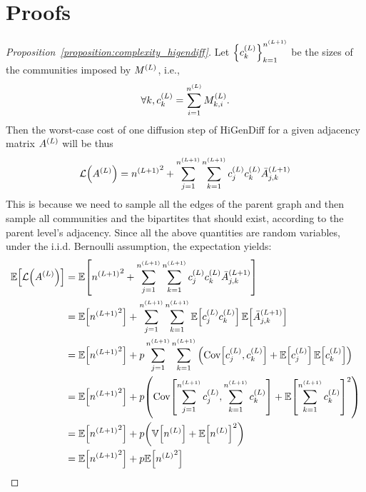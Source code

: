\section{Proofs}
\label{sec:appendix_higendiff_theory}
\begin{proof}[Proposition~\ref{proposition:complexity_higendiff}]
Let $\mathopen{}\left\{c^{\mathopen{}\left(L\right)}_k\right\}_{k=1}^{n^{\mathopen{}\left(L+1\right)}}$ be the sizes of the communities imposed by $M^{\mathopen{}\left(L\right)}$, i.e., 
\begin{equation}
    \forall k, c^{\mathopen{}\left(L\right)}_k=\sum_{i=1}^{n^{\mathopen{}\left(L\right)}}{M^{\mathopen{}\left(L\right)}_{k,i}}.
\end{equation}
Then the worst-case cost of one diffusion step of HiGenDiff for a given adjacency matrix $A^{\mathopen{}\left(L\right)}$ will be thus
\begin{equation}
    \mathcal{L}\mathopen{}\left(A^{\mathopen{}\left(L\right)}\right)={n^{\mathopen{}\left(L+1\right)}}^2 + \sum_{j=1}^{n^{\mathopen{}\left(L+1\right)}}\sum_{k=1}^{n^{\mathopen{}\left(L+1\right)}}{c^{\mathopen{}\left(L\right)}_j c^{\mathopen{}\left(L\right)}_k \bar{A}_{j,k}^{\mathopen{}\left(L+1\right)}}
\end{equation}
This is because we need to sample all the edges of the parent graph and then sample all communities and the bipartites that should exist, according to the parent level's adjacency. Since all the above quantities are random variables, under the i.i.d. Bernoulli assumption, the expectation yields:
\begin{align}
    \begin{split}
        \mathbb{E}\off{\mathcal{L}\of{A^{\of{L}}}}&=\mathbb{E}\off{{n^{\of{L+1}}}^2 + \sum_{j=1}^{n^{\of{L+1}}}\sum_{k=1}^{n^{\of{L+1}}}{c^{\of{L}}_j c^{\of{L}}_k \bar{A}_{j,k}^{\of{L+1}}}} \\
        &= \mathbb{E}\off{{n^{\of{L+1}}}^2}+\sum_{j=1}^{n^{\of{L+1}}}\sum_{k=1}^{n^{\of{L+1}}}{\mathbb{E}\off{c^{\of{L}}_j c^{\of{L}}_k} \mathbb{E}\off{\bar{A}_{j,k}^{\of{L+1}}}} \\
        &= \mathbb{E}\off{{n^{\of{L+1}}}^2}+p\sum_{j=1}^{n^{\of{L+1}}}\sum_{k=1}^{n^{\of{L+1}}}{\of{\mathrm{Cov}\off{c^{\of{L}}_j,c^{\of{L}}_k}+\mathbb{E}\off{c^{\of{L}}_j}\mathbb{E}\off{c^{\of{L}}_k}}} \\
        &= \mathbb{E}\off{{n^{\of{L+1}}}^2}+p\of{\mathrm{Cov}\off{\sum_{j=1}^{n^{\of{L+1}}}{c^{\of{L}}_j},\sum_{k=1}^{n^{\of{L+1}}}{c^{\of{L}}_k}}+\mathbb{E}\off{\sum_{k=1}^{n^{\of{L+1}}}{c^{\of{L}}_k}}^2}\\
         &= \mathbb{E}\off{{n^{\of{L+1}}}^2} +p \of{\mathbb{V}\off{n^{\of{L}}}+\mathbb{E}\off{n^{\of{L}}}^2} \\
          &= \mathbb{E}\off{{n^{\of{L+1}}}^2} + p\mathbb{E}\off{{n^{\of{L}}}^2}
    \end{split}

\end{align}
\end{proof}
